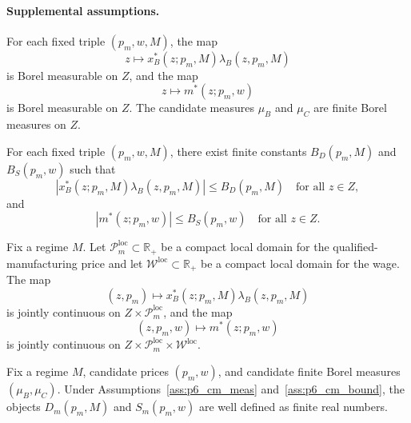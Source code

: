 \paragraph{Supplemental assumptions.}
\begin{assumption}
\label{ass:p6_cm_meas}
For each fixed triple $(p_m,w,M)$, the map
\[
z\mapsto x_B^*(z;p_m,M)\lambda_B(z,p_m,M)
\]
is Borel measurable on $Z$, and the map
\[
z\mapsto m^*(z;p_m,w)
\]
is Borel measurable on $Z$. The candidate measures $\mu_B$ and $\mu_C$ are finite Borel measures on $Z$.
\end{assumption}

\begin{assumption}
\label{ass:p6_cm_bound}
For each fixed triple $(p_m,w,M)$, there exist finite constants $B_D(p_m,M)$ and $B_S(p_m,w)$ such that
\[
\left|x_B^*(z;p_m,M)\lambda_B(z,p_m,M)\right|\le B_D(p_m,M)
\quad\text{for all } z\in Z,
\]
and
\[
\left|m^*(z;p_m,w)\right|\le B_S(p_m,w)
\quad\text{for all } z\in Z.
\]
\end{assumption}

\begin{assumption}
\label{ass:p6_cm_cont}
Fix a regime $M$. Let $\mathcal P_m^{\mathrm{loc}}\subset\mathbb R_+$ be a compact local domain for the qualified-manufacturing price and let $\mathcal W^{\mathrm{loc}}\subset\mathbb R_+$ be a compact local domain for the wage. The map
\[
(z,p_m)\mapsto x_B^*(z;p_m,M)\lambda_B(z,p_m,M)
\]
is jointly continuous on $Z\times \mathcal P_m^{\mathrm{loc}}$, and the map
\[
(z,p_m,w)\mapsto m^*(z;p_m,w)
\]
is jointly continuous on $Z\times \mathcal P_m^{\mathrm{loc}}\times \mathcal W^{\mathrm{loc}}$.
\end{assumption}

\begin{proposition}
Fix a regime $M$, candidate prices $(p_m,w)$, and candidate finite Borel measures $(\mu_B,\mu_C)$. Under Assumptions~\ref{ass:p6_cm_meas} and~\ref{ass:p6_cm_bound}, the objects $D_m(p_m,M)$ and $S_m(p_m,w)$ are well defined as finite real numbers.
\end{proposition}

